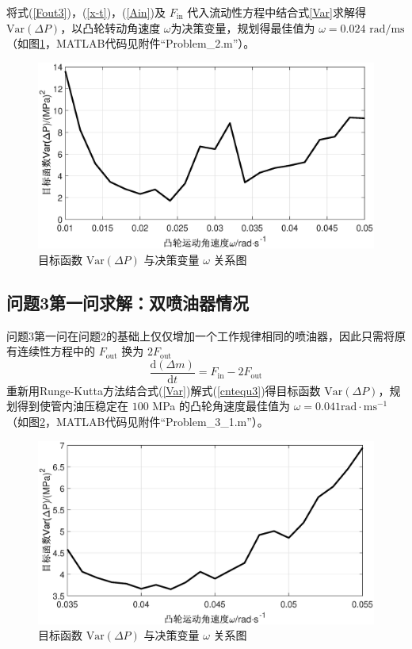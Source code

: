 \documentclass[12pt,a4paper]{article}
\begin{document}
将式(\ref{Fout3})，(\ref{x-t})，(\ref{Ain})及 $F_{\text{in}}$ 代入流动性方程中结合式\ref{Var}求解得 $\text{Var}(\Delta P)$，以凸轮转动角速度 $\omega$为决策变量，规划得最佳值为 $\omega=0.024\text{ rad}/\text{ms}$（如图\ref{Problem_2}，MATLAB代码见附件“Problem\_2.m”）。
\begin{figure}[h]
\centering
\includegraphics[scale=0.5]{Problem_2.eps}
\caption{目标函数 $\text{Var}(\Delta P)$ 与决策变量 $\omega$ 关系图}\label{Problem_2}
\end{figure}

\subsection{问题3第一问求解：双喷油器情况}
问题3第一问在问题2的基础上仅仅增加一个工作规律相同的喷油器，因此只需将原有连续性方程中的 $F_{\text{out}}$ 换为 $2F_{\text{out}}$
\begin{equation}
\label{cntequ3}
\frac{\text{d}(\Delta m)}{\text{d}t}=F_{\text{in}}-2F_{\text{out}}
\end{equation}
重新用Runge-Kutta方法结合式(\ref{Var})解式(\ref{cntequ3})得目标函数 $\text{Var}(\Delta P)$，规划得到使管内油压稳定在 $100$ MPa 的凸轮角速度最佳值为 $\omega=0.041\text{rad}\cdot\text{ms}^{-1}$（如图\ref{Problem_3_1}，MATLAB代码见附件“Problem\_3\_1.m”）。
\begin{figure}[h]
\centering
\includegraphics[scale=0.5]{Problem_3_1.eps}
\caption{目标函数 $\text{Var}(\Delta P)$ 与决策变量 $\omega$ 关系图}\label{Problem_3_1}
\end{figure}
\end{document}
